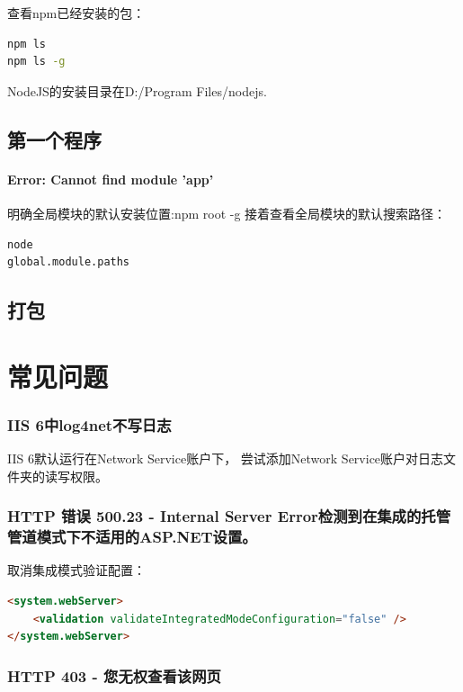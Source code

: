 \documentclass{book}
\begin{document}
查看npm已经安装的包：

\begin{lstlisting}[language=Bash]
npm ls
npm ls -g
\end{lstlisting}


NodeJS的安装目录在D:/Program Files/nodejs.


\subsection{第一个程序}

\paragraph{Error: Cannot find module 'app'}明确全局模块的默认安装位置:npm root -g
接着查看全局模块的默认搜索路径：

\begin{lstlisting}[language=Bash]
node
global.module.paths
\end{lstlisting}




\subsection{打包}




\section{常见问题}

\subsubsection{IIS 6中log4net不写日志}

IIS 6默认运行在Network Service账户下，
尝试添加Network Service账户对日志文件夹的读写权限。

\subsubsection{HTTP 错误 500.23 - Internal Server Error检测到在集成的托管管道模式下不适用的ASP.NET设置。}
取消集成模式验证配置：
\begin{lstlisting}[language=HTML]
<system.webServer>  
    <validation validateIntegratedModeConfiguration="false" />
</system.webServer>
\end{lstlisting}

\subsubsection{HTTP 403 - 您无权查看该网页}
\end{document}
